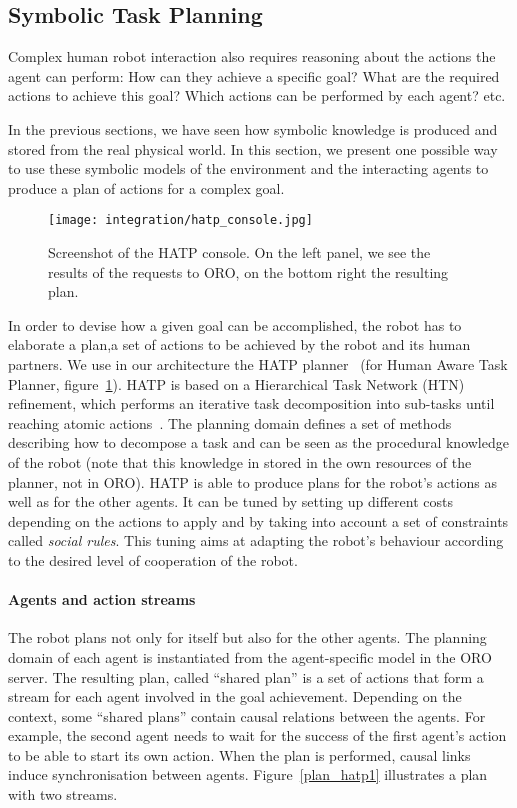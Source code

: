 
\subsection{Symbolic Task Planning}

Complex human robot interaction also requires reasoning about the actions the
agent can perform: How can they achieve a specific goal? What are the required
actions to achieve this goal? Which actions can be performed by each agent?
etc.

In the previous sections, we have seen how symbolic knowledge is produced and
stored from the real physical world. In this section, we present one possible
way to use these symbolic models of the environment and the interacting agents to
produce a plan of actions for a complex goal.

\begin{figure}
    \centering
    \texttt{[image: integration/hatp\_console.jpg]}
    \caption{Screenshot of the HATP console. On the left panel, we see the
    results of the requests to ORO, on the bottom right the resulting plan.}
    \label{fig|hatp_console}
\end{figure}

In order to devise how a given goal can be accomplished, the robot has to
elaborate a plan,\ie a set of actions to be achieved by the robot and its human
partners.  We use in our architecture the HATP planner~\cite{Alili2009} (for
Human Aware Task Planner, figure~\ref{fig|hatp_console}).  HATP is based on a
Hierarchical Task Network (HTN) refinement, which performs an iterative task
decomposition into sub-tasks until reaching atomic actions~\cite{Nau2003}.  The
planning domain defines a set of methods describing how to decompose a task and
can be seen as the procedural knowledge of the robot (note that this knowledge
in stored in the own resources of the planner, not in ORO).  HATP is able to
produce plans for the robot's actions as well as for the other agents. It can
be tuned by setting up different costs depending on the actions to apply and by
taking into account a set of constraints called \emph{social rules}. This
tuning aims at adapting the robot's behaviour according to the desired level of
cooperation of the robot.

\paragraph{Agents and action streams} The robot plans not only for itself but
also for the other agents. The planning domain of each agent is instantiated
from the agent-specific model in the ORO server. The resulting plan, called
``shared plan'' is a set of actions that form a stream for each agent involved
in the goal achievement.  Depending on the context, some ``shared plans''
contain causal relations between the agents. For example, the second agent
needs to wait for the success of the first agent's action to be able to start
its own action. When the plan is performed, causal links induce synchronisation
between agents.  Figure~\ref{plan_hatp1} illustrates a plan with two streams.

